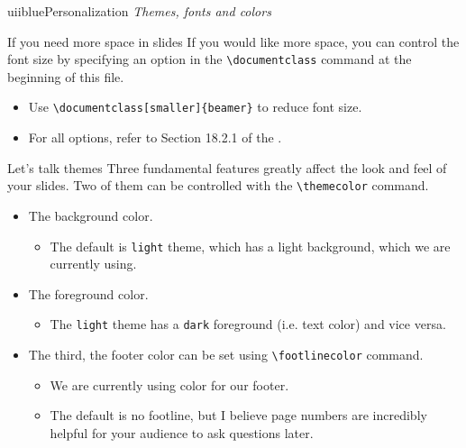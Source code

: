 
\begin{chapter}{uiiblue}{Personalization}
\textit{Themes, fonts and colors}
\end{chapter}


\begin{frame}[fragile]{If you need more space in slides}
If you would like more space, you can control the font size by specifying an option in the \verb|\documentclass| command at the beginning of this file.
\begin{itemize}
    \item Use \verb|\documentclass[smaller]{beamer}| to reduce font size.
    \item For all options, refer to Section 18.2.1 of the .
\end{itemize}
\end{frame}


\begin{frame}[fragile]{Let's talk themes}
Three fundamental features greatly affect the look and feel of your slides. Two of them can be controlled with the \verb|\themecolor| command.
\begin{itemize}
\item The background color.
\begin{itemize}
    \item The default is \verb|light| theme, which has a light background, which we are currently using.
\end{itemize}
\item The foreground color.
\begin{itemize}
    \item The \verb|light| theme has a \verb|dark| foreground (i.e. text color) and vice versa.
\end{itemize}
\item The third, the footer color can be set using \verb|\footlinecolor| command.
\begin{itemize}
    \item We are currently using  color for our footer.
    \item The default is no footline, but I believe page numbers are incredibly helpful for your audience to ask questions later.
\end{itemize}
\end{itemize}
\end{frame}



